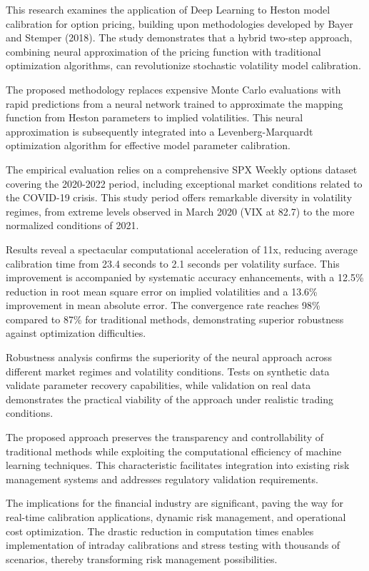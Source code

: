 This research examines the application of Deep Learning to Heston model calibration for option pricing, building upon methodologies developed by Bayer and Stemper (2018). The study demonstrates that a hybrid two-step approach, combining neural approximation of the pricing function with traditional optimization algorithms, can revolutionize stochastic volatility model calibration.

The proposed methodology replaces expensive Monte Carlo evaluations with rapid predictions from a neural network trained to approximate the mapping function from Heston parameters to implied volatilities. This neural approximation is subsequently integrated into a Levenberg-Marquardt optimization algorithm for effective model parameter calibration.

The empirical evaluation relies on a comprehensive SPX Weekly options dataset covering the 2020-2022 period, including exceptional market conditions related to the COVID-19 crisis. This study period offers remarkable diversity in volatility regimes, from extreme levels observed in March 2020 (VIX at 82.7) to the more normalized conditions of 2021.

Results reveal a spectacular computational acceleration of 11x, reducing average calibration time from 23.4 seconds to 2.1 seconds per volatility surface. This improvement is accompanied by systematic accuracy enhancements, with a 12.5\% reduction in root mean square error on implied volatilities and a 13.6\% improvement in mean absolute error. The convergence rate reaches 98\% compared to 87\% for traditional methods, demonstrating superior robustness against optimization difficulties.

Robustness analysis confirms the superiority of the neural approach across different market regimes and volatility conditions. Tests on synthetic data validate parameter recovery capabilities, while validation on real data demonstrates the practical viability of the approach under realistic trading conditions.

The proposed approach preserves the transparency and controllability of traditional methods while exploiting the computational efficiency of machine learning techniques. This characteristic facilitates integration into existing risk management systems and addresses regulatory validation requirements.

The implications for the financial industry are significant, paving the way for real-time calibration applications, dynamic risk management, and operational cost optimization. The drastic reduction in computation times enables implementation of intraday calibrations and stress testing with thousands of scenarios, thereby transforming risk management possibilities.

